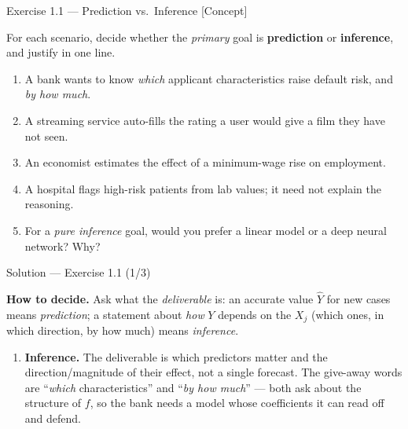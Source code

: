 \documentclass[aspectratio=169,11pt]{beamer}
\begin{document}
\begin{frame}{Exercise 1.1 --- Prediction vs.\ Inference [Concept]}
\begin{exercise}
For each scenario, decide whether the \emph{primary} goal is
\textbf{prediction} or \textbf{inference}, and justify in one line.
\begin{enumerate}
  \item A bank wants to know \emph{which} applicant characteristics
        raise default risk, and \emph{by how much}.
  \item A streaming service auto-fills the rating a user would give a
        film they have not seen.
  \item An economist estimates the effect of a minimum-wage rise on
        employment.
  \item A hospital flags high-risk patients from lab values; it need
        not explain the reasoning.
  \item For a \emph{pure inference} goal, would you prefer a linear
        model or a deep neural network? Why?
\end{enumerate}
\end{exercise}
\end{frame}

\begin{frame}{Solution --- Exercise 1.1 (1/3)}
\begin{solutionbox}
\textbf{How to decide.} Ask what the \emph{deliverable} is: an accurate
value $\hat Y$ for new cases means \emph{prediction}; a statement about
\emph{how} $Y$ depends on the $X_j$ (which ones, in which direction, by
how much) means \emph{inference}.
\begin{enumerate}
  \item \textbf{Inference.} The deliverable is which predictors matter
        and the direction/magnitude of their effect, not a single
        forecast. The give-away words are ``\emph{which}
        characteristics'' and ``\emph{by how much}'' --- both ask about
        the structure of $f$, so the bank needs a model whose
        coefficients it can read off and defend.
  \end{enumerate}
\end{solutionbox}
\end{frame}
\end{document}
